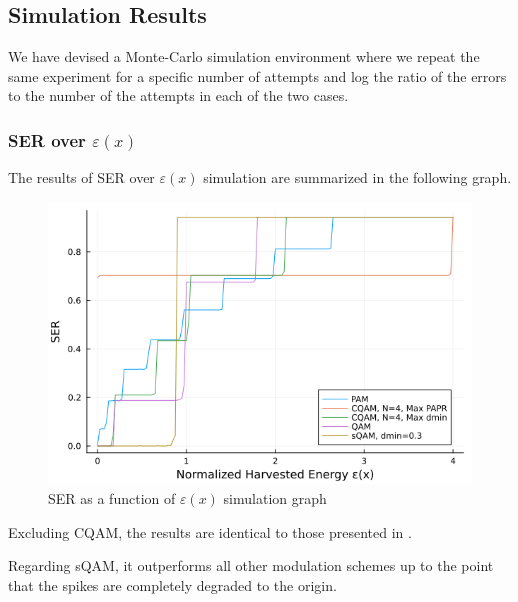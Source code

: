 \documentclass[11pt,a4paper,onecolumn,final]{article}
\newcommand{\eps}{\varepsilon}
\begin{document}
\subsection{Simulation Results}
We have devised a Monte-Carlo simulation environment where we repeat the same experiment for a specific number of attempts and log the ratio of the errors to the number of the attempts in each of the two cases. 

\subsubsection*{SER over \(\eps(x)\)}
The results of SER over \(\eps(x)\) simulation are summarized in the following graph. 

\begin{figure}[h]
    \centering
    \includegraphics[scale=0.59]{ex2_a.png}
    \caption{SER as a function of \(\eps(x)\) simulation graph}
\end{figure}
Excluding CQAM, the results are identical to those presented in \cite{cqam}. 

Regarding sQAM, it outperforms all other modulation schemes up to the point that the spikes are completely degraded to the origin. 
\end{document}
